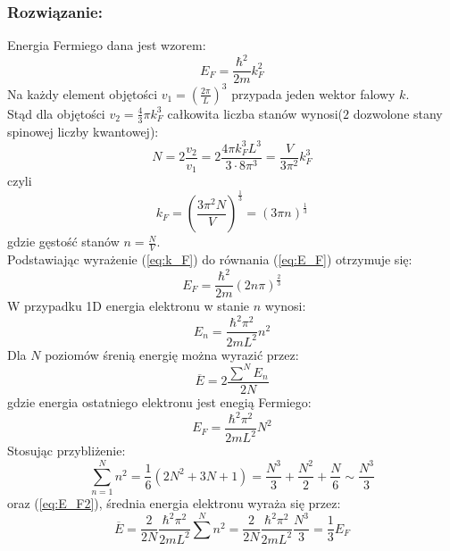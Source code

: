\subsubsection*{Rozwiązanie:}
Energia Fermiego dana jest wzorem:
\begin{equation}
\label{eq:E_F}
E_F = \frac{\hbar^2}{2m}k_F^2
\end{equation}
Na każdy element objętości $v_1 = \left(\frac{2\pi}{L}\right)^3$ przypada jeden wektor falowy $k$.\\
Stąd dla objętości $v_2 = \frac{4}{3}\pi k_F^3$ całkowita liczba stanów wynosi($2$ dozwolone stany spinowej liczby kwantowej):
\begin{equation}
N = 2 \frac{v_2}{v_1} = 2 \frac{4\pi k_F^3 L^3}{3\cdot 8 \pi^3} =  \frac{V}{3\pi^2}k_F^3
\end{equation}
czyli
\begin{equation}
\label{eq:k_F}
k_F = \left( \frac{3 \pi^2 N}{V} \right)^{\frac{1}{3}} =  (3\pi n)^{\frac{1}{3}}
\end{equation} 
gdzie gęstość stanów $n = \frac{N}{V}$.\\
Podstawiając wyrażenie (\ref{eq:k_F}) do równania (\ref{eq:E_F}) otrzymuje się:
\begin{equation}
E_F = \frac{\hbar^2}{2m} (2n\pi)^{\frac{2}{3}}
\end{equation} 
\hrulefill
\newline
W przypadku 1D energia elektronu w stanie $n$ wynosi:
\begin{equation}
E_n = \frac{\hbar^2 \pi^2}{2mL^2}n^2
\end{equation}
Dla  $N$ poziomów śrenią energię można wyrazić przez:
\begin{equation}
\overline{E} = 2 \frac{\sum^N E_n}{2N}
\end{equation}
gdzie energia ostatniego elektronu jest enegią Fermiego:
\begin{equation}
\label{eq:E_F2}
E_F = \frac{\hbar^2 \pi^2}{2mL^2} N^2
\end{equation}
Stosując przybliżenie:
\begin{equation}
\sum^N_{n=1} n^2 = \frac{1}{6}(2N^2 + 3N + 1) = \frac{N^3}{3} + \frac{N^2}{2} + \frac{N}{6} \sim \frac{N^3}{3}
\end{equation} 
oraz (\ref{eq:E_F2}), średnia energia elektronu wyraża się przez:
\begin{equation}
\overline{E} = \frac{2}{2N} \frac{\hbar^2 \pi^2}{2mL^2} \sum^N n^2 = \frac{2}{2N} \frac{\hbar^2 \pi^2}{2mL^2} \frac{N^3}{3} = \frac{1}{3} E_F
\end{equation}



